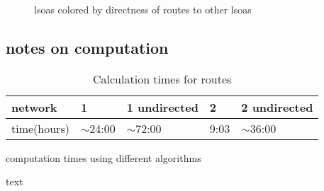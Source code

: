\begin{figure}
\centering
\caption{lsoas colored by directness of routes to other lsoas}
\label{fig:lsoa_directness}
\end{figure}

\subsection{notes on computation}




\begin{table}[]
\centering
\begin{tabular}{@{}l|llll@{}}
network     & 1           & 1 undirected & 2    & 2 undirected \\ \hline
time(hours) & $\sim$24:00 & $\sim$72:00  & 9:03 & $\sim$36:00 
\end{tabular}
\caption{Calculation times for routes}
\label{table:net_calc_times}
\end{table}

\begin{table}
\centering
\caption{computation times using different algorithms}
\label{table:comp_times_algo}
\end{table}


text